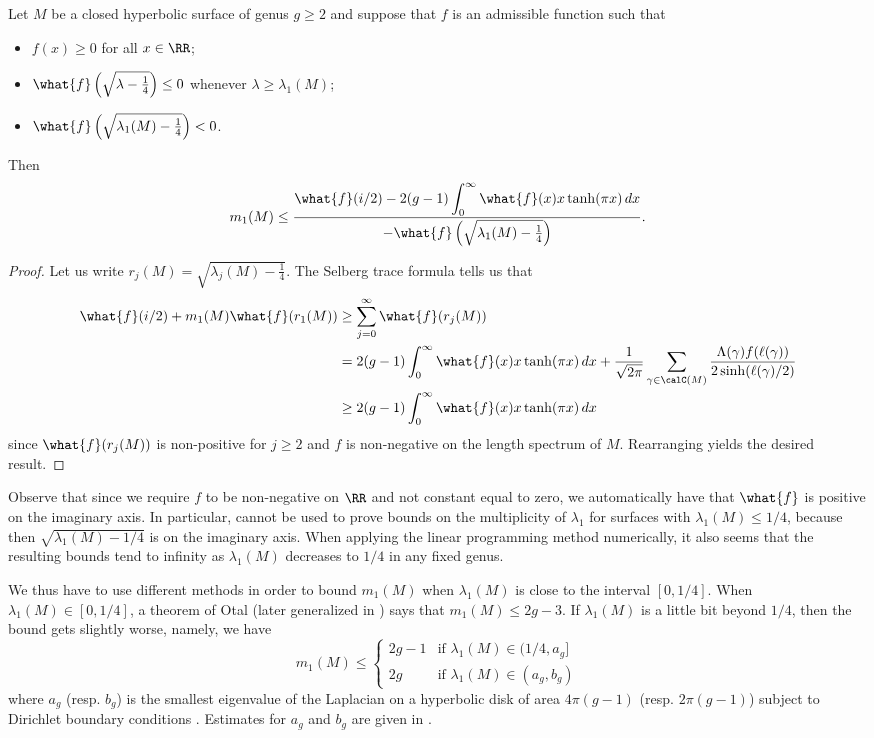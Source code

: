 \documentclass[12pt]{amsart}
\numberwithin{equation}{section}
\begin{document}
\begin{thm} \label{thm:mult}
Let $M$ be a closed hyperbolic surface of genus $g\geq 2$ and suppose that $f$ is an admissible function such that
\begin{itemize}
\item $f(x) \geq 0$ for all $x \in \RR$;
\item $\what{f}\left(\sqrt{\lambda-\frac14}\right) \leq 0 $ whenever $\lambda \geq \lambda_1(M)$;
\item $\what{f}\left(\sqrt{\lambda_1(M)-\frac14}\right) <0$.
\end{itemize}
Then
\[
m_1(M) \leq  \frac{\what{f}(i/2) - 2(g-1)\displaystyle\int_0^\infty \what{f}(x) x \tanh(\pi x)\, dx}{-\what{f}\left(\sqrt{\lambda_1(M)-\frac14}\right)}.
\]
\end{thm}
\begin{proof}
Let us write $r_j(M) = \sqrt{\lambda_j(M)-\frac14}$. The Selberg trace formula tells us that
\begin{align*}
\what{f}(i/2) + m_1(M) \what{f}(r_1(M))  & \geq \sum_{j=0}^\infty \what{f}(r_j(M))  \\
&= 2(g-1) \int_0^\infty \what{f}(x) x \tanh(\pi x) \,dx  + \frac{1}{\sqrt{2\pi}} \sum_{\gamma \in \calC(M)} \frac{\Lambda(\gamma)f(\ell(\gamma))}{2 \sinh(\ell(\gamma)/2)}  \\
& \geq 2(g-1) \int_0^\infty \what{f}(x) x\tanh(\pi x) \,dx
\end{align*}
since $\what{f}(r_j(M))$ is non-positive for $j\geq 2$ and $f$ is non-negative on the length spectrum of $M$. Rearranging yields the desired result.
\end{proof}

Observe that since we require $f$ to be non-negative on $\RR$ and not constant equal to zero, we automatically have that $\what{f}$ is positive on the imaginary axis. In particular,   cannot be used to prove bounds on the multiplicity of $\lambda_1$ for surfaces with $\lambda_1(M) \leq 1/4$, because then $\sqrt{\lambda_1(M) - 1/4}$ is on the imaginary axis. When applying the linear programming method numerically, it also seems that the resulting bounds tend to infinity as $\lambda_1(M)$ decreases to $1/4$ in any fixed genus.

We thus have to use different methods in order to bound $m_1(M)$ when $\lambda_1(M)$ is close to the interval $[0,1/4]$. When $\lambda_1(M) \in [0,1/4]$, a theorem of Otal \cite{Otal} (later generalized in \cite{OtalRosas}) says that $m_1(M) \leq 2g-3$. If $\lambda_1(M)$ is a little bit beyond $1/4$, then the bound gets slightly worse, namely, we have
\[
m_1(M) \leq  \begin{cases}2g-1 & \text{if }\lambda_1(M) \in (1/4,a_g] \\ 2g & \text{if } \lambda_1(M) \in (a_g,b_g)\end{cases}
\]
where $a_g$ (resp. $b_g$) is the smallest eigenvalue of the Laplacian on a hyperbolic disk of area $4\pi(g-1)$ (resp. $2\pi(g-1)$) subject to Dirichlet boundary conditions \cite[Theorem 1.1]{Klein}. Estimates for $a_g$ and $b_g$ are given in \cite[Section 2]{Klein}.
\end{document}
